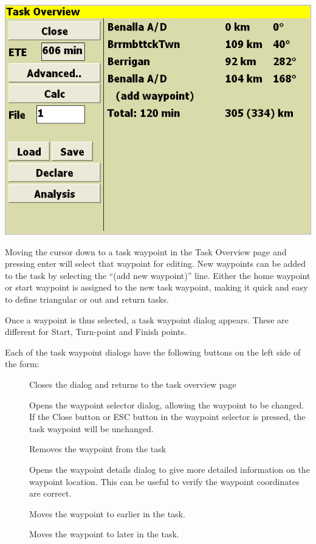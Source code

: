 \documentclass[a4paper,12pt]{refrep}
\begin{document}
\begin{center}
\includegraphics[angle=0,width=\linewidth,keepaspectratio='true']{figures/dialog-taskedit2.png}
\end{center}


Moving the cursor down to a task waypoint in the Task Overview page
and pressing enter will select that waypoint for editing.  New
waypoints can be added to the task by selecting the ``(add new
waypoint)'' line.  Either the home waypoint or start waypoint is
assigned to the new task waypoint, making it quick and easy to define
triangular or out and return tasks.

Once a waypoint is thus selected, a task waypoint dialog appears.
These are different for Start, Turn-point and Finish points.

Each of the task waypoint dialogs have the following buttons on the
left side of the form:
\begin{description}
\item[] Closes the dialog and returns to the task overview page
\item[] Opens the waypoint selector dialog, allowing the waypoint to be
 changed.  If the Close button or ESC button in the waypoint selector
 is pressed, the task waypoint will be unchanged.
\item[] Removes the waypoint from the task
\item[] Opens the waypoint details dialog to give more detailed information on the waypoint location.  
This can be useful to verify the waypoint coordinates are correct.
\item[] Moves the waypoint to earlier in the task.
\item[] Moves the waypoint to later in the task.
\end{description}
\end{document}
